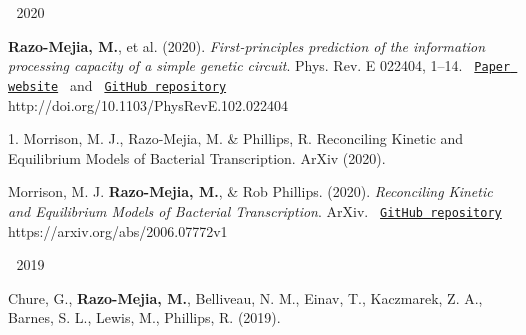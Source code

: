 
\begin{cventries}
  \cventry
  {$\;$}
  {2020}
  {$\;$}
  {$\;$}
  {
    \begin{cvitems} %
        \item {
          \begin{flushleft}
            \textbf{Razo-Mejia, M.}, et al. (2020).
            \textit{First-principles prediction of the information processing
            capacity of a simple genetic circuit}. Phys. Rev. E 022404, 1–14.
            \texttt{
            \href{https://www.rpgroup.caltech.edu/chann_cap/}{Paper website} 
            }
            and
            \texttt{
            \href{https://github.com/RPGroup-PBoC/chann_cap}{GitHub repository}
            }
            \linebreak
            http://doi.org/10.1103/PhysRevE.102.022404
          \end{flushleft}
        }
        1. Morrison, M. J., Razo-Mejia, M. & Phillips, R. Reconciling Kinetic and Equilibrium Models of Bacterial Transcription. ArXiv (2020).
        \item {
          \begin{flushleft}
            Morrison, M. J. \textbf{Razo-Mejia, M.}, \& Rob Phillips. (2020).
            \textit{Reconciling Kinetic and Equilibrium Models of Bacterial
            Transcription}. ArXiv. \texttt{
            \href{https://github.com/RPGroup-PBoC/bursty_transcription}{GitHub repository}
            }
            \linebreak
            https://arxiv.org/abs/2006.07772v1
          \end{flushleft}
        }
    \end{cvitems}
  }
  \cventry
    {$\;$}
    {2019}
    {$\;$}
    {$\;$}
    {
      \begin{cvitems} %
        \item {
        \begin{flushleft}
          Chure, G., \textbf{Razo-Mejia, M.}, Belliveau, N. M., Einav, T.,
          Kaczmarek, Z. A., Barnes, S. L., Lewis, M., Phillips, R. (2019).

\end{flushleft}}
\end{cvitems}}
\end{cventries}
